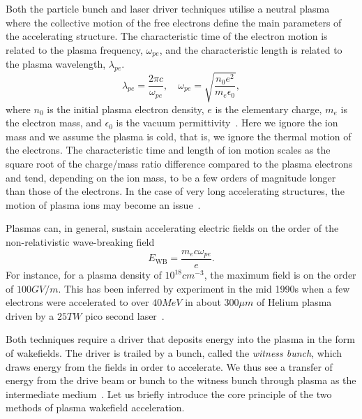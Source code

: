 Both the particle bunch and laser driver techniques utilise a neutral plasma where the collective motion of the free electrons define the main parameters of the accelerating structure.
The characteristic time of the electron motion is related to the plasma frequency, $\omega_{pe}$, and the characteristic length is related to the plasma wavelength, $\lambda_{pe}$.
\begin{equation}
    \lambda_{pe} = \frac{2\pi c}{\omega_{pe}}, \quad
    \omega_{pe}  = \sqrt{\frac{n_{0}e^{2}}{m_{e}\epsilon_{0}}}, \label{EQ:PWFA:L0W0}
\end{equation}
where $n_{0}$ is the initial plasma electron density, $e$ is the elementary charge, $m_{e}$ is the electron mass, and $\epsilon_{0}$ is the vacuum permittivity~\cite{tonks:1929, esarey:1996, pecseli:2012}.
Here we ignore the ion mass and we assume the plasma is cold, that is, we ignore the thermal motion of the electrons.
The characteristic time and length of ion motion scales as the square root of the charge/mass ratio difference compared to the plasma electrons and tend, depending on the ion mass, to be a few orders of magnitude longer than those of the electrons.
In the case of very long accelerating structures, the motion of plasma ions may become an issue~\cite{rosenzweig:2005}.

Plasmas can, in general, sustain accelerating electric fields on the order of the non-relativistic wave-breaking field~\cite{dawson:1959, esarey:1996}
\begin{equation}
    E_{\mathrm{WB}} = \frac{m_{e} c \omega_{pe}}{e}. \label{EQ:EWB}
\end{equation}
For instance, for a plasma density of $10^{18}\unit{cm}^{-3}$, the maximum field is on the order of $100\unit{GV/m}$.
This has been inferred by experiment in the mid 1990s when a few electrons were accelerated to over $40\unit{MeV}$ in about $300\unit{\mu m}$ of Helium plasma driven by a $25\unit{TW}$ pico second laser~\cite{modena:1995}.

Both techniques require a driver that deposits energy into the plasma in the form of wakefields.
The driver is trailed by a bunch, called the \textit{witness bunch}, which draws energy from the fields in order to accelerate.
We thus see a transfer of energy from the drive beam or bunch to the witness bunch through plasma as the intermediate medium~\cite{muggli:2009}.
Let us briefly introduce the core principle of the two methods of plasma wakefield acceleration. 

